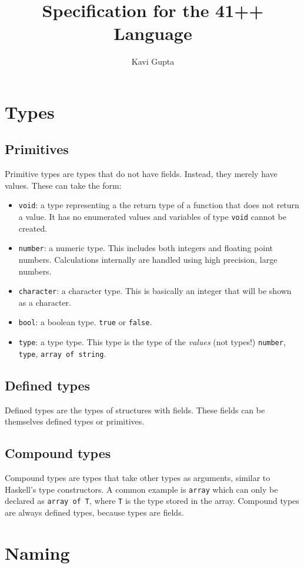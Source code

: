 \documentclass{article}
\newcommand{\code}[1]{\texttt{#1}}
\begin{document}
\title{Specification for the 41++ Language}
\author{Kavi Gupta}
\maketitle
\section{Types}
\subsection{Primitives}
Primitive types are types that do not have fields. Instead, they merely have values. These can take the form:
\begin{itemize}
\item \code{void}: a type representing a the return type of a function that does not return a value. It has no enumerated values and variables of type \code{void} cannot be created.
\item \code{number}: a numeric type. This includes both integers and floating point numbers. Calculations internally are handled using high precision, large numbers.
\item \code{character}: a character type. This is basically an integer that will be shown as a character.
\item \code{bool}: a boolean type. \code{true} or \code{false}.
\item \code{type}: a type type. This type is the type of the \emph{values} (not types!) \code{number}, \code{type}, \code{array of string}.
\end{itemize}
\subsection{Defined types}
Defined types are the types of structures with fields. These fields can be themselves defined types or primitives.
\subsection{Compound types}
Compound types are types that take other types as arguments, similar to Haskell's type constructors. A common example is \code{array} which can only be declared as \code{array of T}, where \code{T} is the type stored in the array. Compound types are always defined types, because types are fields.
\section{Naming}
\end{document}
